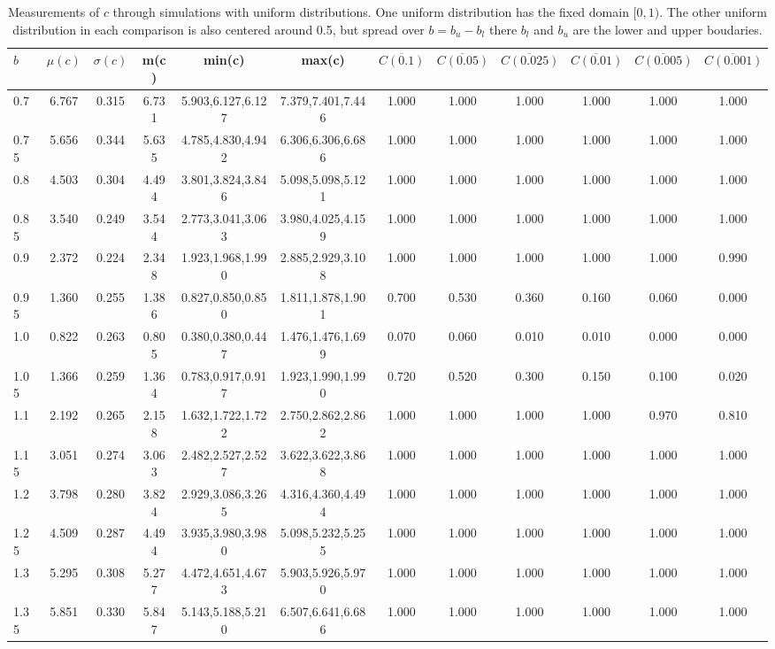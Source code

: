 \begin{table*}[h!]
\begin{center}
\begin{tabular}{| l | c | c | c | c | c | c | c | c | c | c | c |}\hline
$b$ & $\mu(c)$ & $\sigma(c)$ & m(c) & min(c) & max(c) & $\overline{C(0.1)}$ & $\overline{C(0.05)}$ & $\overline{C(0.025)}$ & $\overline{C(0.01)}$ & $\overline{C(0.005)}$ & $\overline{C(0.001)}$ \\\hline
0.7 & 6.767 & 0.315 & 6.731 & 5.903,6.127,6.127 & 7.379,7.401,7.446  & 1.000  & 1.000  & 1.000  & 1.000  & 1.000  & 1.000 \\\hline
0.75 & 5.656 & 0.344 & 5.635 & 4.785,4.830,4.942 & 6.306,6.306,6.686  & 1.000  & 1.000  & 1.000  & 1.000  & 1.000  & 1.000 \\\hline
0.8 & 4.503 & 0.304 & 4.494 & 3.801,3.824,3.846 & 5.098,5.098,5.121  & 1.000  & 1.000  & 1.000  & 1.000  & 1.000  & 1.000 \\\hline
0.85 & 3.540 & 0.249 & 3.544 & 2.773,3.041,3.063 & 3.980,4.025,4.159  & 1.000  & 1.000  & 1.000  & 1.000  & 1.000  & 1.000 \\\hline
0.9 & 2.372 & 0.224 & 2.348 & 1.923,1.968,1.990 & 2.885,2.929,3.108  & 1.000  & 1.000  & 1.000  & 1.000  & 1.000  & 0.990 \\\hline
0.95 & 1.360 & 0.255 & 1.386 & 0.827,0.850,0.850 & 1.811,1.878,1.901  & 0.700  & 0.530  & 0.360  & 0.160  & 0.060  & 0.000 \\\hline
1.0 & 0.822 & 0.263 & 0.805 & 0.380,0.380,0.447 & 1.476,1.476,1.699  & 0.070  & 0.060  & 0.010  & 0.010  & 0.000  & 0.000 \\\hline
1.05 & 1.366 & 0.259 & 1.364 & 0.783,0.917,0.917 & 1.923,1.990,1.990  & 0.720  & 0.520  & 0.300  & 0.150  & 0.100  & 0.020 \\\hline
1.1 & 2.192 & 0.265 & 2.158 & 1.632,1.722,1.722 & 2.750,2.862,2.862  & 1.000  & 1.000  & 1.000  & 1.000  & 0.970  & 0.810 \\\hline
1.15 & 3.051 & 0.274 & 3.063 & 2.482,2.527,2.527 & 3.622,3.622,3.868  & 1.000  & 1.000  & 1.000  & 1.000  & 1.000  & 1.000 \\\hline
1.2 & 3.798 & 0.280 & 3.824 & 2.929,3.086,3.265 & 4.316,4.360,4.494  & 1.000  & 1.000  & 1.000  & 1.000  & 1.000  & 1.000 \\\hline
1.25 & 4.509 & 0.287 & 4.494 & 3.935,3.980,3.980 & 5.098,5.232,5.255  & 1.000  & 1.000  & 1.000  & 1.000  & 1.000  & 1.000 \\\hline
1.3 & 5.295 & 0.308 & 5.277 & 4.472,4.651,4.673 & 5.903,5.926,5.970  & 1.000  & 1.000  & 1.000  & 1.000  & 1.000  & 1.000 \\\hline
1.35 & 5.851 & 0.330 & 5.847 & 5.143,5.188,5.210 & 6.507,6.641,6.686  & 1.000  & 1.000  & 1.000  & 1.000  & 1.000  & 1.000 \\\hline
\end{tabular}
\caption{Measurements of $c$ through simulations
        with uniform distributions.
        One uniform distribution has the fixed domain $[0,1)$.
        The other uniform distribution in each comparison
        is also centered around 0.5,
        but spread over $b=b_u-b_l$ there $b_l$ and $b_u$ are the lower and upper boudaries.}
\end{center}
\end{table*}
